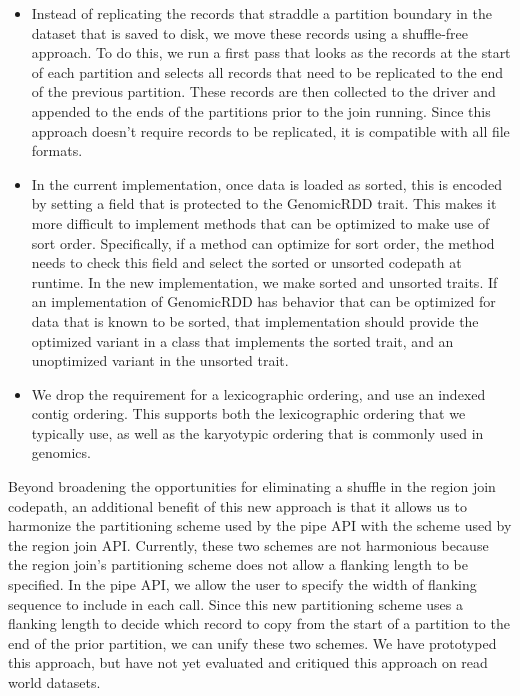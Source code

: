 \documentclass[phd]{ucbthesis}
\begin{document}
\begin{itemize}
\item Instead of replicating the records that straddle a partition boundary in
  the dataset that is saved to disk, we move these records using a shuffle-free
  approach. To do this, we run a first pass that looks as the records at the
  start of each partition and selects all records that need to be replicated to
  the end of the previous partition. These records are then collected to the
  driver and appended to the ends of the partitions prior to the join running.
  Since this approach doesn't require records to be replicated, it is compatible
  with all file formats.
\item In the current implementation, once data is loaded as sorted, this is
  encoded by setting a field that is protected to the {GenomicRDD} trait.
  This makes it more difficult to implement methods that can be optimized to
  make use of sort order. Specifically, if a method can optimize for sort order,
  the method needs to check this field and select the sorted or unsorted
  codepath at runtime. In the new implementation, we make sorted and unsorted
  traits. If an implementation of {GenomicRDD} has behavior that can
  be optimized for data that is known to be sorted, that implementation should
  provide the optimized variant in a class that implements the sorted trait, and
  an unoptimized variant in the unsorted trait.
\item We drop the requirement for a lexicographic ordering, and use an indexed
  contig ordering. This supports both the lexicographic ordering that we
  typically use, as well as the karyotypic ordering that is commonly used in
  genomics.
\end{itemize}

Beyond broadening the opportunities for eliminating a shuffle in the region join
codepath, an additional benefit of this new approach is that it allows us to
harmonize the partitioning scheme used by the {pipe} API with the scheme
used by the region join API. Currently, these two schemes are not harmonious
because the region join's partitioning scheme does not allow a flanking length
to be specified. In the {pipe} API, we allow the user to specify the
width of flanking sequence to include in each call. Since this new partitioning
scheme uses a flanking length to decide which record to copy from the start of
a partition to the end of the prior partition, we can unify these two schemes.
We have prototyped this approach, but have not yet evaluated and critiqued this
approach on read world datasets.
\end{document}
